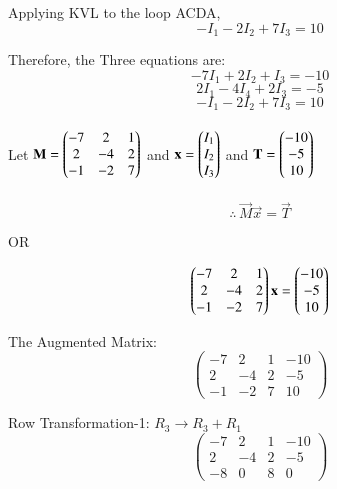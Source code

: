 \documentclass[journal]{IEEEtran}
\begin{document}
Applying KVL to the loop ACDA,
\begin{equation}
-I_1 - 2I_2 + 7I_3 = 10    
\end{equation}

Therefore, the Three equations are: 
$$ -7I_1 + 2I_2 + I_3 = -10$$
$$2I_1 - 4I_4 + 2I_3 = -5$$
$$-I_1 - 2I_2 + 7I_3 = 10$$\\

Let $\mathbf{M} = \begin{pmatrix}-7 & 2 & 1 \\ 2 & -4 & 2 \\ -1 & -2 & 7\end{pmatrix}$ and $\mathbf{x} = \begin{pmatrix}I_1 \\ I_2 \\ I_3\end{pmatrix}$ and $\mathbf{T} = \begin{pmatrix}-10 \\ -5 \\ 10\end{pmatrix}$\\\\

\begin{equation}
    \therefore \, \vec{M}\vec{x}=\vec{T}
\end{equation}

\begin{center}
OR    
\end{center}

\begin{equation}
    \begin{pmatrix}-7 & 2 & 1 \\ 2 & -4 & 2 \\ -1 & -2 & 7\end{pmatrix}\mathbf{x} = \begin{pmatrix}-10 \\ -5 \\ 10\end{pmatrix}
\end{equation}

The Augmented Matrix:
\begin{equation}
\left(
\begin{array}{ccc|c}
     -7 & 2 & 1 & -10  \\
     2 & -4 & 2 & -5 \\
     -1 & -2 & 7 & 10 
\end{array}
\right)
\end{equation}

Row Transformation-1: $R_3 \rightarrow R_3 + R_1$
\begin{equation}
\left(
\begin{array}{ccc|c}
     -7 & 2 & 1 & -10  \\
     2 & -4 & 2 & -5 \\
     -8 & 0 & 8 & 0 
\end{array}
\right)
\end{equation}
\end{document}
